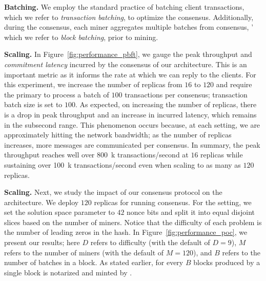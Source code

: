 {\bf Batching.}
We employ the standard practice of batching client transactions, which we refer to 
\textit{transaction batching}, to optimize the \pbft{} consensus. Additionally, during 
the \PoC{} consensus, each miner aggregates multiple batches from \pbft{} consensus, '
which we refer to \textit{block batching}, prior to mining. 

 
{\bf \pbft{} Scaling.}
In Figure~\ref{fig:performance_pbft}, we gauge the peak throughput and 
\textit{commitment latency} incurred by the \pbft{} consensus of our \DualChain{} 
architecture. This is an important metric as it informs the rate at which we 
can reply to the clients. For this experiment, we increase the number of replicas 
from $16$ to $120$ and require the primary to process a batch of $100$ 
transactions per consensus; transaction batch size is set to $100$. 
As expected, on increasing the number of replicas, there is a drop in peak 
throughput and an increase in incurred latency, which remains in the subsecond 
range. This phenomenon occurs because, at each setting, we are approximately 
hitting the network bandwidth; as the number of replicas increases, more messages 
are communicated per consensus. In summary, the peak throughput reaches well 
over \SI{800}{k} transactions/second at $16$ replicas while sustaining over 
\SI{100}{k} transactions/second even when scaling to as many as $120$ replicas.


{\bf \PoC{} Scaling.}
Next, we study the impact of our \PoC{} consensus protocol on the \DualChain{} 
architecture. We deploy $120$ replicas for running \PBFT{} consensus. For the 
\PoC{} setting, we set the solution space parameter to $42$ nonce bits and 
split it into equal disjoint slices based on the number of miners. Notice that 
the difficulty of each problem is the number of leading zeros in the hash. In 
Figure~\ref{fig:performance_poc}, we present our results; here $D$ refers to 
difficulty (with the default of $D=9$), $M$ refers to the number of miners 
(with the default of $M=120$), and $B$ refers to the number of batches in a block. 
As stated earlier, for every $B$ blocks produced by \PBFT{} a single block is 
notarized and minted by \PoC{}.
 
